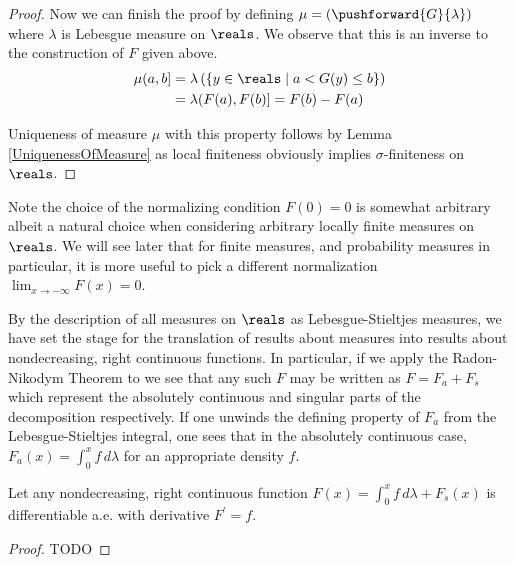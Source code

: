 \begin{proof}
Now we can finish the proof by 
defining $\mu = (\pushforward{G}{\lambda})$ where $\lambda$ is Lebesgue
measure on $\reals$.  We observe that this is an inverse to the
construction of $F$ given above.  
\begin{align*}
\mu (a,b] &= \lambda \left ( \lbrace y \in \reals \mid a < G(y)  \leq b
  \rbrace \right ) \\
&= \lambda (F(a), F(b)] = F(b) - F(a)
\end{align*}

Uniqueness of measure $\mu$ with this property follows by Lemma
\ref{UniquenessOfMeasure} as local finiteness obviously implies
$\sigma$-finiteness on $\reals$.
\end{proof}

Note the choice of the normalizing condition $F(0) = 0$ is somewhat
arbitrary albeit a natural choice when considering arbitrary locally
finite measures on $\reals$.  We will see later that for finite
measures, and probability
measures in particular, it is more useful to pick a different
normalization $\lim_{x \to -\infty} F(x) = 0$.

By the description of all measures on $\reals$ as
Lebesgue-Stieltjes measures, we have set the stage for the
translation of results about measures into results about
nondecreasing, right continuous functions.  In particular, if we apply
the Radon-Nikodym Theorem to we see that any such $F$ may be written
as $F = F_a + F_s$ which represent the absolutely continuous and
singular parts of the decomposition respectively.  If one unwinds the
defining property of $F_a$ from the Lebesgue-Stieltjes integral, one
sees
 that in the absolutely continuous case, $F_a(x) = \int_0^x f \,
 d\lambda$ for an appropriate density $f$.

\begin{thm}\label{FundamentalTheoremOfCalculus}Let any nondecreasing, right continuous function $F(x) = \int_0^x
  f \, d\lambda + F_s(x)$ is differentiable a.e. with derivative $F^\prime = f$.
\end{thm}
\begin{proof}
TODO
\end{proof}

